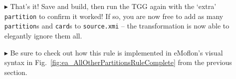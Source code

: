 \begin{itemize}
\item[$\blacktriangleright$] That's it! Save and build, then run the TGG again with the `extra' \texttt{partition} to confirm it worked!
If so, you are now free to add as many \texttt{partition}s and \texttt{card}s to \texttt{source.xmi} -- the transformation is now able to elegantly ignore them all.

\vspace{0.5cm}

\item[$\blacktriangleright$] Be sure to check out how this rule is implemented in eMoflon's visual syntax in Fig.~\ref{fig:ea_AllOtherPartitionsRuleComplete} from
the previous section.

\end{itemize}
